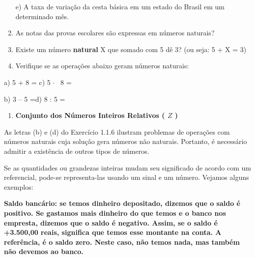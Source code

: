 \documentclass[12pt]{article}
\renewcommand{\_}{\kern-1.5pt\textunderscore\kern-1.5pt}
\begin{document}
\begin{enumerate}
e) A taxa de variação da cesta básica em um estado do Brasil em um determinado mês.\par

	\item As notas das provas escolares são expressas em números naturais?\par

	\item Existe um número \textbf{natural} X que somado com 5 dê 3? (ou seja: 5 + X = 3)\par

	\item Verifique se as operações abaixo geram números naturais:
\end{enumerate}\par

\begin{adjustwidth}{0.2in}{0.0in}
a) 5 + 8 = \tab \tab \tab c) 5 $ \cdot $ \  8 = \par

\end{adjustwidth}

\begin{adjustwidth}{0.2in}{0.0in}
b) 3 – 5 =\tab \tab \tab \tab d) 8 : 5 =\par

\end{adjustwidth}


\vspace{\baselineskip}
\begin{enumerate}
	\item \textbf{Conjunto dos Números Inteiros Relativos ( \( Z \) )}
\end{enumerate}\par

As letras (b) e (d) do Exercício 1.1.6 ilustram problemas de operações com números naturais cuja solução gera números não naturais. Portanto, é necessário admitir a existência de outros tipos de números.\par

Se as quantidades ou grandezas inteiras mudam seu significado de acordo com um referencial, pode-se representa-las usando um sinal e um número. Vejamos alguns exemplos:\par

\textbf{Saldo bancário: se temos dinheiro depositado, dizemos que o saldo é positivo. Se gastamos mais dinheiro do que temos e o banco nos empresta, dizemos que o saldo é negativo. Assim, se o saldo é +3.500,00 reais, significa que temos esse montante na conta. A referência, é o saldo zero. Neste caso, não temos nada, mas também não devemos ao banco.}\par
\end{document}
